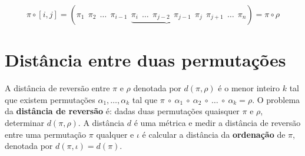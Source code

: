 \[
\pi \circ [i,j] = (
\pi_1 \ \ 
\pi_2 \ \ \ldots \ \
\pi_{i-1} \ \ 
\underbrace{\pi_{i} \ \ \ldots \ \
\pi_{j-2} \ \ 
\pi_{j-1} \ \ 
\pi_{j}} \ \ 
\pi_{j+1} \ \  \ldots \ \ \pi_n) = \pi \circ \rho
\]









%  

\section{Distância entre duas permutações}

A distância de reversão entre $\pi$ e $\rho$ denotada por $d(\pi,\rho)$ é o menor inteiro $k$ tal que existem permutações $\alpha_1,\ldots,\alpha_k$ tal que $\pi \ \circ \ \alpha_1 \ \circ \ \alpha_2 \ \circ \ \ldots \ \circ \ \alpha_k = \rho$. O problema da \textbf{distância de reversão} é: dadas duas permutações quaisquer $\pi$ e $\rho$, determinar $d(\pi,\rho)$. A distância $d$ é uma métrica \cite{Lages} e medir a distância de reversão entre uma permutação $\pi$ qualquer e $\iota$ é calcular a distância da \textbf{ordenação} de $\pi$, denotada por $d(\pi,\iota) = d(\pi)$.


